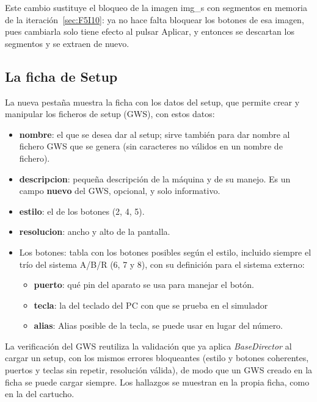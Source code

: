 Este cambio sustituye el bloqueo de la imagen img\_s con segmentos en memoria de la iteración~\ref{sec:F5I10}: ya no hace falta bloquear los botones de esa imagen, pues cambiarla solo tiene efecto al pulsar Aplicar, y entonces se descartan los segmentos y se extraen de nuevo.

\subsection{La ficha de Setup}
\label{sec:F5I12Ficha}

La nueva pestaña muestra la ficha con los datos del setup, que permite crear y manipular los ficheros de setup (GWS), con estos datos:

\begin{itemize}
	\item \textbf{nombre}: el que se desea dar al setup; sirve también para dar nombre al fichero GWS que se genera (sin caracteres no válidos en un nombre de fichero).
	
	\item \textbf{descripcion}: pequeña descripción de la máquina y de su manejo. Es un campo \textbf{nuevo} del GWS, opcional, y solo informativo.
	
	\item \textbf{estilo}: el de los botones (2, 4, 5). 
	
	\item \textbf{resolucion}: ancho y alto de la pantalla.
	
	\item Los botones: tabla con los botones posibles según el estilo, incluido siempre el trío del sistema A/B/R (6, 7 y 8), con su definición para el sistema externo: 
	\begin{itemize}
		\item \textbf{puerto}: qué pin del aparato se usa para manejar el botón. 
		\item \textbf{tecla}: la del teclado del PC con que se prueba en el simulador
		\item \textbf{alias}: Alias posible de la tecla, se puede usar en lugar del número.	
	\end{itemize}
\end{itemize}

La verificación del GWS reutiliza la validación que ya aplica \emph{BaseDirector} al cargar un setup, con los mismos errores bloqueantes (estilo y botones coherentes, puertos y teclas sin repetir, resolución válida), de modo que un GWS creado en la ficha se puede cargar siempre. Los hallazgos se muestran en la propia ficha, como en la del cartucho.

